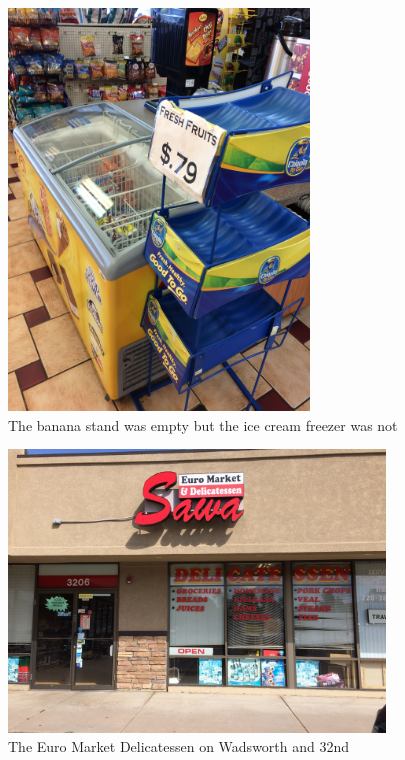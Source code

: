\documentclass[11pt]{article}
\begin{document}
\begin{figure}[H]
    \centering
    \includegraphics[width=80mm]{resources/empty-banana-stand.jpg}
    \caption{The banana stand was empty but the ice cream freezer was not}
\end{figure}

\begin{figure}[H]
    \centering
    \includegraphics[width=100mm]{resources/delicatessen.jpg}
    \caption{The Euro Market Delicatessen on Wadsworth and 32nd}
\end{figure}
\end{document}
